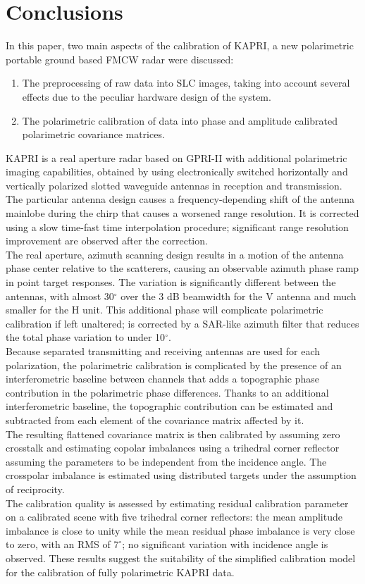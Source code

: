\section{Conclusions}\label{sec:conclusions}
In this paper, two main aspects of the calibration of KAPRI, a new polarimetric portable ground based FMCW radar were discussed:
\begin{enumerate}
	\item The preprocessing of raw data into SLC images, taking into account several effects due to the peculiar hardware design of the system.
	\item The polarimetric calibration of data into phase and amplitude calibrated polarimetric covariance matrices.
\end{enumerate}
KAPRI is a real aperture radar based on GPRI-II with additional polarimetric imaging capabilities, obtained by using electronically switched horizontally and vertically polarized slotted waveguide antennas in reception and transmission.\\ The particular antenna design causes a frequency-depending shift of the antenna mainlobe during the chirp that causes a worsened range resolution. It is corrected using a slow time-fast time interpolation procedure; significant range resolution improvement are observed after the correction.\\ The real aperture, azimuth scanning design results in a motion of the antenna phase center relative to the scatterers, causing an observable azimuth phase ramp in point target responses. The variation is significantly different between the antennas, with almost 30$^\circ$ over the 3 dB beamwidth for the V antenna and much smaller for the H unit. This additional phase will complicate polarimetric calibration if left unaltered; is corrected by a SAR-like azimuth filter that reduces the total phase variation to under 10$^\circ$.\\
Because separated transmitting and receiving antennas are used for each polarization, the polarimetric calibration is complicated by the presence of an interferometric baseline between channels that adds a topographic phase contribution in the polarimetric phase differences. Thanks to an additional interferometric baseline, the topographic contribution can be estimated and subtracted from each element of the covariance matrix affected by it.\\
The resulting flattened covariance matrix is then calibrated  by assuming zero crosstalk and estimating copolar imbalances using a trihedral corner reflector assuming the parameters to be independent from the  incidence angle. The crosspolar imbalance is estimated using distributed targets under the assumption of reciprocity.\\
The calibration quality is assessed by estimating residual calibration parameter on a calibrated scene with five trihedral corner reflectors: the mean amplitude imbalance is close to unity while the mean residual phase imbalance is very close to zero, with an RMS of $7^\circ$; no significant variation with incidence angle is observed. These results suggest the suitability of the simplified calibration model for the calibration of fully polarimetric KAPRI data.





